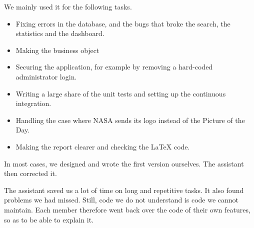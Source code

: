 We mainly used it for the following tasks.
\begin{itemize}
  \item Fixing errors in the database, and the bugs that broke the search, the statistics
    and the dashboard.
  \item Making the business object
  \item Securing the application, for example by removing a hard-coded administrator login.
  \item Writing a large share of the unit tests and setting up the continuous integration.
  \item Handling the case where NASA sends its logo instead of the Picture of the Day.
  \item Making the report clearer and checking the LaTeX code.
\end{itemize}
In most cases, we designed and wrote the first version ourselves. The assistant then corrected it.


The assistant saved us a lot of time on long and repetitive tasks. It also found problems we had
missed. Still, code we do not understand is code we cannot maintain. Each member therefore went
back over the code of their own features, so as to be able to explain it.


